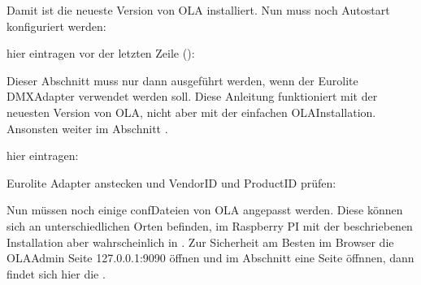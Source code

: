 \documentclass[letterpaper,10pt,ngerman]{sphinxmanual}
\begin{document}
Damit ist die neueste Version von OLA installiert. Nun muss noch Autostart
konfiguriert werden:


hier eintragen vor der letzten Zeile ():



Dieser Abschnitt muss nur dann ausgeführt werden, wenn der Eurolite DMX\sphinxhyphen{}Adapter
verwendet werden soll. Diese Anleitung funktioniert mit der neuesten Version
von OLA, nicht aber mit der einfachen OLA\sphinxhyphen{}Installation.
Ansonsten weiter im
Abschnitt .


hier eintragen:


Eurolite Adapter anstecken und Vendor\sphinxhyphen{}ID und Product\sphinxhyphen{}ID prüfen:

\begin{sphinxVerbatim}[commandchars=\\\{\}]
  
  
   
\end{sphinxVerbatim}

Nun müssen noch einige conf\sphinxhyphen{}Dateien von OLA angepasst werden. Diese können sich
an unterschiedlichen Orten befinden, im Raspberry PI mit der beschriebenen
Installation aber wahrscheinlich in .
Zur Sicherheit am Besten im Browser die
OLA\sphinxhyphen{}Admin Seite 127.0.0.1:9090 öffnen und im Abschnitt  eine Seite
öffnnen, dann findet sich hier die .
\end{document}
